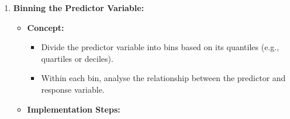 \documentclass[
  letterpaper,
]{book}
\providecommand{\tightlist}{%
  \setlength{\itemsep}{0pt}\setlength{\parskip}{0pt}}\usepackage{longtable,booktabs,array}
\begin{document}
\begin{enumerate}
\begin{itemize}
\begin{enumerate}
      \begin{itemize}
      \tightlist
      \item
        The coefficients \(\beta_1(\theta, \tau)\) show how the
        \(\tau\)-th quantile of the wind stress curl affects the
        \(\theta\)-th quantile of SST.
      \item
        By varying \(\theta\) and \(\tau\), you can map out the entire
        dependence structure.
      \end{itemize}
    \end{enumerate}
  \item
    \textbf{Advantages:}

    \begin{itemize}
    \tightlist
    \item
      Captures non-linear and asymmetric relationships between the
      variables.
    \item
      Allows for interactions between different parts of the
      distributions.
    \end{itemize}
  \item
    \textbf{Considerations:}

    \begin{itemize}
    \tightlist
    \item
      \textbf{Computational Complexity:} Estimating the model for all
      combinations of \(\theta\) and \(\tau\) can be computationally
      intensive.
    \item
      \textbf{Data Requirements:} Requires a large dataset to obtain
      reliable estimates across quantiles.
    \end{itemize}
  \end{itemize}
\item
  \textbf{Binning the Predictor Variable:}

  \begin{itemize}
  \tightlist
  \item
    \textbf{Concept:}

    \begin{itemize}
    \tightlist
    \item
      Divide the predictor variable into bins based on its quantiles
      (e.g., quartiles or deciles).
    \item
      Within each bin, analyse the relationship between the predictor
      and response variable.
    \end{itemize}
  \item
    \textbf{Implementation Steps:}


\end{itemize}
\end{enumerate}
\end{document}
